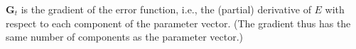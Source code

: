 
$\textbf{G}_{t}$ is the gradient of the error function, i.e., the (partial) derivative of $E$ with respect to each component
of the parameter vector. (The gradient thus has the same number of components as the parameter vector.)









